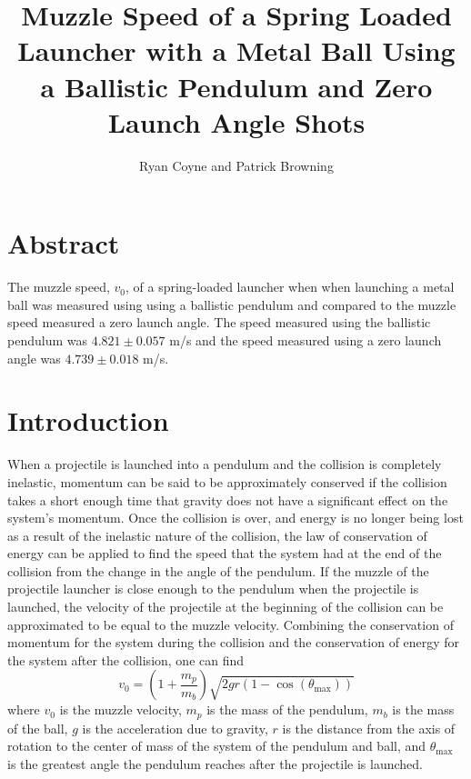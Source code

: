 \documentclass[12pt]{article}
\begin{document}
    \title{Muzzle Speed of a Spring Loaded Launcher with a Metal Ball Using a Ballistic Pendulum and Zero Launch Angle Shots}
    \author{Ryan Coyne and Patrick Browning}
    \maketitle
    \section{Abstract}
        The muzzle speed, \(v_0\), of a spring-loaded launcher when when launching a metal ball was measured using using a ballistic pendulum and compared to the muzzle speed measured a zero launch angle. The speed measured using the ballistic pendulum was \(4.821\pm 0.057\) m/s and the speed measured using a zero launch angle was \(4.739\pm 0.018 \) m/s.
    \section{Introduction}
        When a projectile is launched into a pendulum and the collision is completely inelastic, momentum can be said to be approximately conserved if the collision takes a short enough time that gravity does not have a significant effect on the system's momentum. Once the collision is over, and energy is no longer being lost as a result of the inelastic nature of the collision, the law of conservation of energy can be applied to find the speed that the system had at the end of the collision from the change in the angle of the pendulum. If the muzzle of the projectile launcher is close enough to the pendulum when the projectile is launched, the velocity of the projectile at the beginning of the collision can be approximated to be equal to the muzzle velocity. Combining the conservation of momentum for the system during the collision and the conservation of energy for the system after the collision, one can find
        \begin{equation*}
            v_0 = (1+\frac{m_p}{m_b})\sqrt{2gr(1-\cos(\theta_{\mathrm{max}}))}
        \end{equation*}
        where \(v_0\) is the muzzle velocity, \(m_p\) is the mass of the pendulum, \(m_b\) is the mass of the ball, \(g\) is the acceleration due to gravity, \(r\) is the distance from the axis of rotation to the center of mass of the system of the pendulum and ball, and \(\theta_{\mathrm{max}}\) is the greatest angle the pendulum reaches after the projectile is launched.
        
\end{document}
